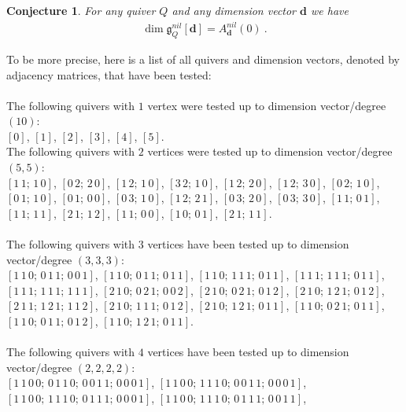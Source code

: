 \documentclass{article}
\newcommand{\bd}{\mathbf{d}}
\newtheorem{conjecture}[theorem]{Conjecture}
\begin{document}
\begin{conjecture}\label{conjecture}
   For any quiver $Q$ and any dimension vector $\bd$ we have
\begin{align*}
    \dim \mathfrak{g}_Q^{nil} [\bd] = A^{nil}_{\bd}(0) ~.
\end{align*} 
\end{conjecture}
To be more precise, here is a list of all quivers and dimension vectors, denoted by adjacency matrices, that have been tested: \\
\\
The following quivers with $1$ vertex were tested up to dimension vector/degree $(10)$:\\
$[0]$, $[1]$, $[2]$, $[3]$, $[4]$, $[5]$.\\
 
The following quivers with $2$ vertices were tested up to dimension vector/degree $(5,5)$:\\
$[1\,1;\,1\,0]$, $[0\,2;\,2\,0]$, $[1\,2;\,1\,0]$, $[3\,2;\,1\,0]$, $[1\,2;\,2\,0]$, $[1\,2;\,3\,0]$, $[0\,2;\,1\,0]$, $[0\,1;\,1\,0]$, $[0\,1;\,0\,0]$, $[0\,3;\,1\,0]$, $[1\,2;\,2\,1]$, $[0\,3;\,2\,0]$, $[0\,3;\,3\,0]$, $[1\,1;\,0\,1]$, $[1\,1;\,1\,1]$, $[2\,1;\,1\,2]$, $[1\,1;\,0\,0]$, $[1\,0;\,0\,1]$, $[2\,1;\,1\,1]$.\\
 \\
The following quivers with $3$ vertices have been tested up to dimension vector/degree $(3,3,3)$:\\
$[1\,1\,0;\,0\,1\,1;\,0\,0\,1]$, $[1\,1\,0;\,0\,1\,1;\,0\,1\,1]$, $[1\,1\,0;\,1\,1\,1;\,0\,1\,1]$, $[1\,1\,1;\,1\,1\,1;\,0\,1\,1]$, \\
$[1\,1\,1;\,1\,1\,1;\,1\,1\,1]$, $[2\,1\,0;\,0\,2\,1;\,0\,0\,2]$, $[2\,1\,0;\,0\,2\,1;\,0\,1\,2]$, $[2\,1\,0;\,1\,2\,1;\,0\,1\,2]$,\\
$[2\,1\,1;\,1\,2\,1;\,1\,1\,2]$, $[2\,1\,0;\,1\,1\,1;\,0\,1\,2]$, $[2\,1\,0;\,1\,2\,1;\,0\,1\,1]$, $[1\,1\,0;\,0\,2\,1;\,0\,1\,1]$,\\
$[1\,1\,0;\,0\,1\,1;\,0\,1\,2]$, $[1\,1\,0;\,1\,2\,1;\,0\,1\,1]$.\\
 \\
The following quivers with $4$ vertices have been tested up to dimension vector/degree $(2,2,2,2)$:\\
$[1\,1\,0\,0;\,0\,1\,1\,0;\,0\,0\,1\,1;\,0\,0\,0\,1]$,
$[1\,1\,0\,0;\,1\,1\,1\,0;\,0\,0\,1\,1;\,0\,0\,0\,1]$,\\
$[1\,1\,0\,0;\,1\,1\,1\,0;\,0\,1\,1\,1;\,0\,0\,0\,1]$, 
$[1\,1\,0\,0;\,1\,1\,1\,0;\,0\,1\,1\,1;\,0\,0\,1\,1]$, \\
\end{document}
